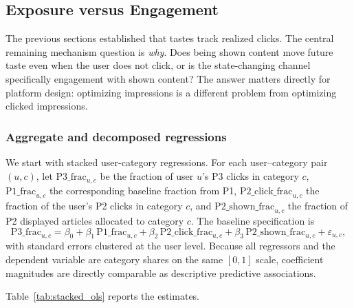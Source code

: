 \documentclass[11pt]{article}
\begin{document}
\subsection{Exposure versus Engagement}
\label{sec:exposure}

The previous sections established that tastes track realized clicks. The central remaining mechanism question is \emph{why}. Does being shown content move future taste even when the user does not click, or is the state-changing channel specifically engagement with shown content? The answer matters directly for platform design: optimizing impressions is a different problem from optimizing clicked impressions.

\subsubsection{Aggregate and decomposed regressions}

We start with stacked user-category regressions. For each user--category pair $(u,c)$, let $\text{P3\_frac}_{u,c}$ be the fraction of user $u$'s P3 clicks in category $c$, $\text{P1\_frac}_{u,c}$ the corresponding baseline fraction from P1, $\text{P2\_click\_frac}_{u,c}$ the fraction of the user's P2 clicks in category $c$, and $\text{P2\_shown\_frac}_{u,c}$ the fraction of P2 displayed articles allocated to category $c$. The baseline specification is
\[
\text{P3\_frac}_{u,c}
=
\beta_0
+
\beta_1\,\text{P1\_frac}_{u,c}
+
\beta_2\,\text{P2\_click\_frac}_{u,c}
+
\beta_3\,\text{P2\_shown\_frac}_{u,c}
+
\varepsilon_{u,c},
\]
with standard errors clustered at the user level. Because all regressors and the dependent variable are category shares on the same $[0,1]$ scale, coefficient magnitudes are directly comparable as descriptive predictive associations.

Table~\ref{tab:stacked_ols} reports the estimates.
\end{document}
